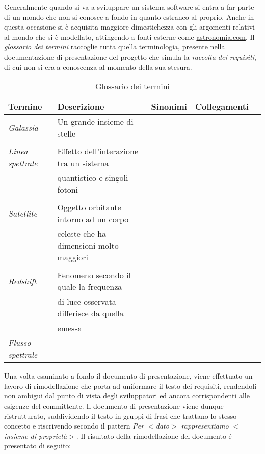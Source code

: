 \documentclass[12pt,a4paper,onecolumn]{article}
\begin{document}
	Generalmente quando si va a sviluppare un sistema software si entra a far parte di un mondo che non si conosce a fondo in quanto estraneo al proprio. Anche in questa occasione si è acquisita maggiore dimestichezza con gli argomenti relativi al mondo che si è modellato, attingendo a fonti esterne come \textsf{\href{http://www.astronomia.com}{astronomia.com}}. Il \textit{glossario dei termini} raccoglie tutta quella terminologia, presente nella documentazione di presentazione del progetto che simula la \textit{raccolta dei requisiti}, di cui non si era a conoscenza al momento della sua stesura.

	\begin{table}[h]
		\centering
		\caption{Glossario dei termini}
		\begin{tabular}{lllll}
			\hline
			\rowcolor[HTML]{66CC99}Termine & Descrizione & Sinonimi & Collegamenti				  \\ \hline
			
			\textit{Galassia}			&	Un grande insieme di stelle					&	-	 &\\
										&												&		 &\\
			\textit{Linea spettrale}	&	Effetto dell'interazione tra un sistema		&  		 &\\
										&   quantistico e singoli fotoni				&	- 	 &\\
										&  					                     		&        &\\
			\textit{Satellite}			& 	Oggetto orbitante intorno ad un corpo		&		 &\\
										& 	celeste che ha dimensioni molto maggiori	&		 &\\
										&												&		 &\\
			\textit{Redshift} 			& 	Fenomeno secondo il quale la frequenza 		&		 &\\
										& 	di luce osservata differisce da quella		&		 &\\
										& 	emessa 										&		 &\\
			\textit{Flusso spettrale}	&												&		 &\\	
		\end{tabular}
	\end{table}

	Una volta esaminato a fondo il documento di presentazione, viene effettuato un lavoro di rimodellazione che porta ad uniformare il testo dei requisiti, rendendoli non ambigui dal punto di vista degli sviluppatori ed ancora corrispondenti alle esigenze del committente. Il documento di presentazione viene dunque ristrutturato, suddividendo il testo in gruppi di frasi che trattano lo stesso concetto e riscrivendo secondo il pattern \textit{Per $<$dato$>$ rappresentiamo $<$insieme di proprietà$>$}.\newpage
	Il risultato della rimodellazione del documento \'{e} presentato di seguito:
	
\end{document}

